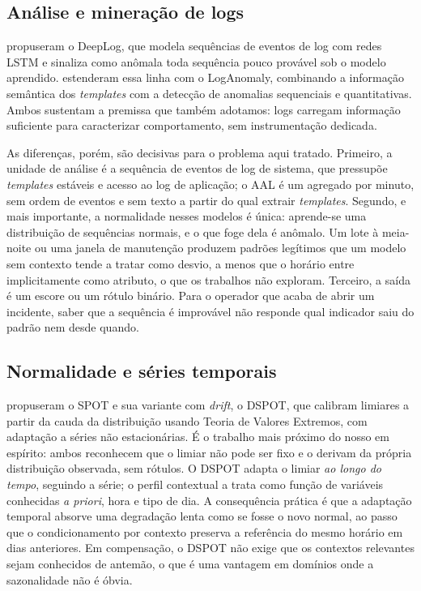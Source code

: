 \documentclass[sigconf,nonacm]{acmart}
\begin{document}
\subsection{Análise e mineração de logs}
\citet{du2017deeplog} propuseram o DeepLog, que modela sequências de eventos de log com redes LSTM e sinaliza como anômala toda sequência pouco provável sob o modelo aprendido. \citet{meng2019loganomaly} estenderam essa linha com o LogAnomaly, combinando a informação semântica dos \emph{templates} com a detecção de anomalias sequenciais e quantitativas. Ambos sustentam a premissa que também adotamos: logs carregam informação suficiente para caracterizar comportamento, sem instrumentação dedicada.

As diferenças, porém, são decisivas para o problema aqui tratado. Primeiro, a unidade de análise é a sequência de eventos de log de sistema, que pressupõe \emph{templates} estáveis e acesso ao log de aplicação; o AAL é um agregado por minuto, sem ordem de eventos e sem texto a partir do qual extrair \emph{templates}. Segundo, e mais importante, a normalidade nesses modelos é única: aprende-se uma distribuição de sequências normais, e o que foge dela é anômalo. Um lote à meia-noite ou uma janela de manutenção produzem padrões legítimos que um modelo sem contexto tende a tratar como desvio, a menos que o horário entre implicitamente como atributo, o que os trabalhos não exploram. Terceiro, a saída é um escore ou um rótulo binário. Para o operador que acaba de abrir um incidente, saber que a sequência é improvável não responde qual indicador saiu do padrão nem desde quando.

\subsection{Normalidade e séries temporais}
\citet{siffer2017spot} propuseram o SPOT e sua variante com \emph{drift}, o DSPOT, que calibram limiares a partir da cauda da distribuição usando Teoria de Valores Extremos, com adaptação a séries não estacionárias. É o trabalho mais próximo do nosso em espírito: ambos reconhecem que o limiar não pode ser fixo e o derivam da própria distribuição observada, sem rótulos. O DSPOT adapta o limiar \emph{ao longo do tempo}, seguindo a série; o perfil contextual a trata como função de variáveis conhecidas \emph{a priori}, hora e tipo de dia. A consequência prática é que a adaptação temporal absorve uma degradação lenta como se fosse o novo normal, ao passo que o condicionamento por contexto preserva a referência do mesmo horário em dias anteriores. Em compensação, o DSPOT não exige que os contextos relevantes sejam conhecidos de antemão, o que é uma vantagem em domínios onde a sazonalidade não é óbvia.
\end{document}

